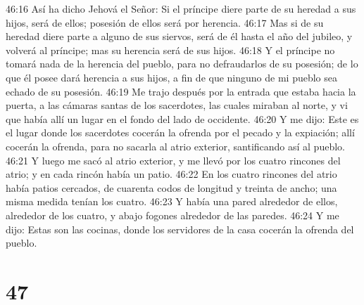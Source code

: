 46:16 Así ha dicho Jehová el Señor: Si el príncipe diere parte de su heredad a sus hijos, será de ellos; posesión de ellos será por herencia.  
46:17 Mas si de su heredad diere parte a alguno de sus siervos, será de él hasta el año del jubileo, y volverá al príncipe; mas su herencia será de sus hijos.  
46:18 Y el príncipe no tomará nada de la herencia del pueblo, para no defraudarlos de su posesión; de lo que él posee dará herencia a sus hijos, a fin de que ninguno de mi pueblo sea echado de su posesión.  
46:19 Me trajo después por la entrada que estaba hacia la puerta, a las cámaras santas de los sacerdotes, las cuales miraban al norte, y vi que había allí un lugar en el fondo del lado de occidente.  
46:20 Y me dijo: Este es el lugar donde los sacerdotes cocerán la ofrenda por el pecado y la expiación; allí cocerán la ofrenda, para no sacarla al atrio exterior, santificando así al pueblo.  
46:21 Y luego me sacó al atrio exterior, y me llevó por los cuatro rincones del atrio; y en cada rincón había un patio.  
46:22 En los cuatro rincones del atrio había patios cercados, de cuarenta codos   de longitud y treinta de ancho; una misma medida tenían los cuatro.  
46:23 Y había una pared alrededor de ellos, alrededor de los cuatro, y abajo fogones alrededor de las paredes.  
46:24 Y me dijo: Estas son las cocinas, donde los servidores de la casa cocerán la ofrenda del pueblo.  

\chapter{47}


